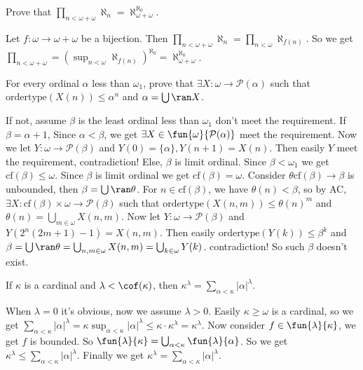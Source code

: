 \documentclass{ctexart}
\begin{document}
\begin{problem}
Prove that \(\prod_{n<\omega+\omega} \aleph_n=\aleph_{\omega+\omega}^{\aleph_0}\).
\end{problem}

\begin{solution}
	Let \(f:\omega \to \omega+\omega\) be a bijection. Then \(\prod_{n<\omega + \omega} \aleph_n=\prod_{n<\omega} \aleph_{f(n)}\).
	So we get \(\prod_{n<\omega+\omega} = \left(\sup_{n<\omega}\aleph_{f(n)}\right)^{\aleph_0}=\aleph_{\omega+\omega}^{\aleph_0}\).
\end{solution}

\begin{problem}
For every ordinal \(\alpha\) less than \(\omega_1\), prove that \(\exists X:\omega \to \mathcal{P}(\alpha)\) such that \(\text{ordertype}(X(n))\leq \alpha^n\) and \(\alpha=\bigcup \ran X \).
\end{problem}

\begin{solution}
	If not, assume \(\beta\) is the least ordinal less than \(\omega_1\) don't meet the requirement.
	If \(\beta=\alpha+1\), Since \(\alpha<\beta\), we get \(\exists X \in \fun{\omega}{\mathcal{P}(\alpha)}\) meet the requirement.
	Now we let \(Y:\omega \to \mathcal{P}(\beta)\) and \(Y(0)=\{\alpha\},Y(n+1)=X(n)\).
	Then easily \(Y\) meet the requirement, contradiction!
	Else, \(\beta\) is limit ordinal. Since \(\beta<\omega_1\) we get \(\text{cf}(\beta)\leq \omega\).
	Since \(\beta\) is limit ordinal we get \(\text{cf}(\beta)=\omega\).
	Consider \(\theta \text{cf}(\beta) \to \beta\) is unbounded, then \(\beta=\bigcup \ran \theta \).
	For \(n \in \text{cf}(\beta)\), we have \(\theta(n)<\beta\), so by AC, \(\exists X:\text{cf}(\beta) \times \omega \to \mathcal{P}(\beta)\) such that
	\(\text{ordertype}(X(n,m)) \leq \theta(n)^m\) and \(\theta(n) = \bigcup_{m \in \omega} X(n,m) \).
	Now let \(Y:\omega \to \mathcal{P}(\beta)\) and \(Y(2^n(2m+1)-1)=X(n,m)\).
	Then easily \(\text{ordertype}(Y(k)) \leq \beta^k\) and \(\beta=\bigcup \ran \theta=\bigcup_{n,m \in \omega} X(n,m)=\bigcup_{k \in \omega} Y(k) \).
	contradiction!
	So such \(\beta\) doesn't exist.
\end{solution}
\begin{problem}
If \(\kappa\) is a cardinal and \(\lambda < \cof(\kappa)\), then \(\kappa^\lambda=\sum_{\alpha<\kappa} |\alpha|^\lambda\).
\end{problem}

\begin{solution}
	When \(\lambda=0\) it's obvious, now we assume \(\lambda>0\).
	Easily \(\kappa \geq \omega\) is a cardinal, so we get \(\sum_{\alpha<\kappa} |\alpha|^\lambda=\kappa \sup_{\alpha<\kappa} |\alpha|^\lambda \leq \kappa \cdot \kappa^\lambda=\kappa^\lambda\).
	Now consider \(f \in \fun{\lambda}{\kappa}\), we get \(f\) is bounded. So \(\fun{\lambda}{\kappa}=\bigcup_{\alpha<\kappa} \fun{\lambda}{\alpha}\).
	So we get \(\kappa^{\lambda}\leq \sum_{\alpha<\kappa} |\alpha|^\lambda\).
	Finally we get \(\kappa^\lambda=\sum_{\alpha<\kappa} |\alpha|^\lambda\).
\end{solution}
\end{document}
